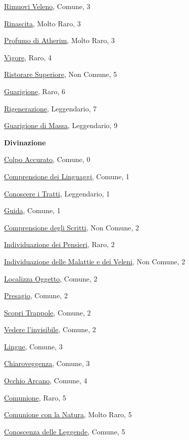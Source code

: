 \begin{multicols}{3}
{{\hyperlink{Rimuovi Veleno}{Rimuovi Veleno}, Comune, 3

\hyperlink{Rinascita}{Rinascita}, Molto Raro, 3

\hyperlink{Profumo di Atherim}{Profumo di Atherim}, Molto Raro, 3

\hyperlink{Vigore}{Vigore}, Raro, 4

\hyperlink{Ristorare Superiore}{Ristorare Superiore}, Non Comune, 5

\hyperlink{Guarigione}{Guarigione}, Raro, 6

\hyperlink{Rigenerazione}{Rigenerazione}, Leggendario, 7

\hyperlink{Guarigione di Massa}{Guarigione di Massa}, Leggendario, 9

\medskip\textbf{Divinazione}

\hyperlink{Colpo Accurato}{Colpo Accurato}, Comune, 0

\hyperlink{Comprensione dei Linguaggi}{Comprensione dei Linguaggi}, Comune, 1

\hyperlink{Conoscere i Tratti}{Conoscere i Tratti}, Leggendario, 1

\hyperlink{Guida}{Guida}, Comune, 1

\hyperlink{Comprensione degli Scritti}{Comprensione degli Scritti}, Non Comune, 2

\hyperlink{Individuazione dei Pensieri}{Individuazione dei Pensieri}, Raro, 2

\hyperlink{Individuazione delle Malattie e dei Veleni}{Individuazione delle Malattie e dei Veleni}, Non Comune, 2

\hyperlink{Localizza Oggetto}{Localizza Oggetto}, Comune, 2

\hyperlink{Presagio}{Presagio}, Comune, 2

\hyperlink{Scopri Trappole}{Scopri Trappole}, Comune, 2

\hyperlink{Vedere l'invisibile}{Vedere l'invisibile}, Comune, 2

\hyperlink{Lingue}{Lingue}, Comune, 3

\hyperlink{Chiaroveggenza}{Chiaroveggenza}, Comune, 3

\hyperlink{Occhio Arcano}{Occhio Arcano}, Comune, 4

\hyperlink{Comunione}{Comunione}, Raro, 5

\hyperlink{Comunione con la Natura}{Comunione con la Natura}, Molto Raro, 5

\hyperlink{Conoscenza delle Leggende}{Conoscenza delle Leggende}, Comune, 5

}}
\end{multicols}
